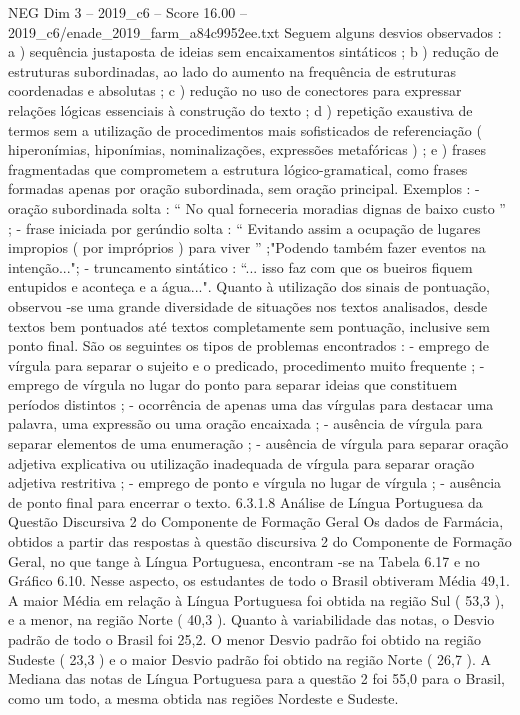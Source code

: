 \begin{textsample}{NEG Dim 3 – 2019\_c6 – Score 16.00 – 2019\_c6/enade\_2019\_farm\_a84c9952ee.txt}
Seguem alguns desvios observados : a ) sequência justaposta de ideias sem encaixamentos sintáticos ; b ) redução de estruturas subordinadas, ao lado do aumento na frequência de estruturas coordenadas e absolutas ; c ) redução no uso de conectores para expressar relações lógicas essenciais à construção do texto ; d ) repetição exaustiva de termos sem a utilização de procedimentos mais sofisticados de referenciação ( hiperonímias, hiponímias, nominalizações, expressões metafóricas ) ; e ) frases fragmentadas que comprometem a estrutura lógico-gramatical, como frases formadas apenas por oração subordinada, sem oração principal.
Exemplos : - oração subordinada solta : “ No qual forneceria moradias dignas de baixo custo ” ; - frase iniciada por gerúndio solta : “ Evitando assim a ocupação de lugares impropios ( por impróprios ) para viver ” ;"Podendo também fazer eventos na intenção..."; - truncamento sintático : “... isso faz com que os bueiros fiquem entupidos e aconteça e a água...".
Quanto à utilização dos sinais de pontuação, observou -se uma grande diversidade de situações nos textos analisados, desde textos bem pontuados até textos completamente sem pontuação, inclusive sem ponto final.
São os seguintes os tipos de problemas encontrados : - emprego de vírgula para separar o sujeito e o predicado, procedimento muito frequente ; - emprego de vírgula no lugar do ponto para separar ideias que constituem períodos distintos ; - ocorrência de apenas uma das vírgulas para destacar uma palavra, uma expressão ou uma oração encaixada ; - ausência de vírgula para separar elementos de uma enumeração ; - ausência de vírgula para separar oração adjetiva explicativa ou utilização inadequada de vírgula para separar oração adjetiva restritiva ; - emprego de ponto e vírgula no lugar de vírgula ; - ausência de ponto final para encerrar o texto. 6.3.1.8 Análise de Língua Portuguesa da Questão Discursiva 2 do Componente de Formação Geral Os dados de Farmácia, obtidos a partir das respostas à questão discursiva 2 do Componente de Formação Geral, no que tange à Língua Portuguesa, encontram -se na Tabela 6.17 e no Gráfico 6.10.
Nesse aspecto, os estudantes de todo o Brasil obtiveram Média 49,1.
A maior Média em relação à Língua Portuguesa foi obtida na região Sul ( 53,3 ), e a menor, na região Norte ( 40,3 ).
Quanto à variabilidade das notas, o Desvio padrão de todo o Brasil foi 25,2.
O menor Desvio padrão foi obtido na região Sudeste ( 23,3 ) e o maior Desvio padrão foi obtido na região Norte ( 26,7 ).
A Mediana das notas de Língua Portuguesa para a questão 2 foi 55,0 para o Brasil, como um todo, a mesma obtida nas regiões Nordeste e Sudeste.

\end{textsample}

